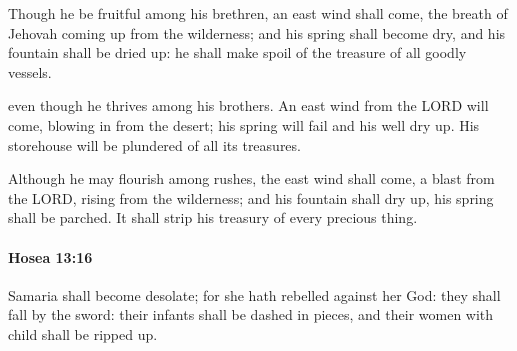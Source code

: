 			\begin{versebox}
					\item[BHS] 
					\item[LXX] 
					\item[ASV] Though he be fruitful among his brethren, an east wind shall come, the breath of Jehovah coming up from the wilderness; and his spring shall become dry, and his fountain shall be dried up: he shall make spoil of the treasure of all goodly vessels.
					\item[NIV] even though he thrives among his brothers. An east wind from the LORD will come, blowing in from the desert; his spring will fail and his well dry up. His storehouse will be plundered of all its treasures.
					\item[NRSV] Although he may flourish among rushes, the east wind shall come, a blast from the LORD, rising from the wilderness; and his fountain shall dry up, his spring shall be parched. It shall strip his treasury of every precious thing.
			\end{versebox}

		\paragraph{Hosea 13:16} %
			\label{HOSEA-13-16}

			Samaria shall become desolate; for she hath rebelled against her God: they shall fall by the sword: their infants shall be dashed in pieces, and their women with child shall be ripped up.

